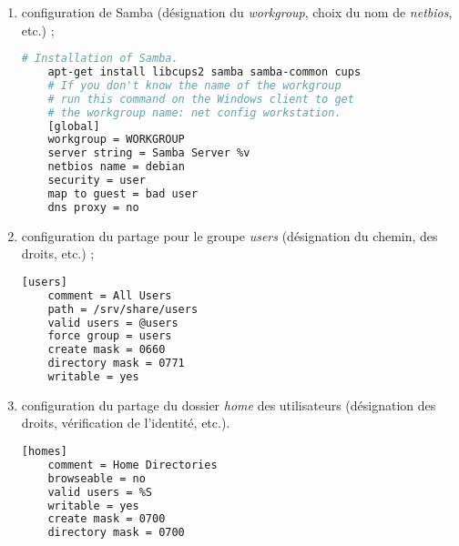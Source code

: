 \begin{enumerate}
\item configuration de Samba (désignation du \emph{workgroup}, choix
  du nom de \emph{netbios}, etc.) ;

  \begin{lstlisting}[language=bash]
    # Installation of Samba.
    apt-get install libcups2 samba samba-common cups
    # If you don't know the name of the workgroup
    # run this command on the Windows client to get
    # the workgroup name: net config workstation.
    [global]
    workgroup = WORKGROUP
    server string = Samba Server %v
    netbios name = debian
    security = user
    map to guest = bad user
    dns proxy = no
  \end{lstlisting}

\item configuration du partage pour le groupe \og \textit{users} \fg
  (désignation du chemin, des droits, etc.) ;

  \begin{lstlisting}[language=bash]
    [users]
    comment = All Users
    path = /srv/share/users
    valid users = @users
    force group = users
    create mask = 0660
    directory mask = 0771
    writable = yes
  \end{lstlisting}

\item configuration du partage du dossier \og \textit{home} \fg des utilisateurs
  (désignation des droits, vérification de l'identité, etc.).

  \begin{lstlisting}[language=bash]
    [homes]
    comment = Home Directories
    browseable = no
    valid users = %S
    writable = yes
    create mask = 0700
    directory mask = 0700
  \end{lstlisting}
\end{enumerate}

